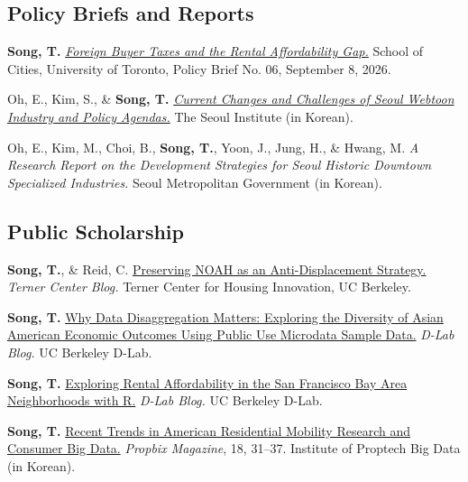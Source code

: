 \documentclass[11pt,letterpaper]{article}
\begin{document}
\subsection{Policy Briefs and Reports}
\begin{tablist}
  \item[2026] \tab{}\textbf{Song, T.} \emph{\href{https://schoolofcities.github.io/posts/foreign-buyer-tax-vancouver-toronto/}{Foreign Buyer Taxes and the Rental Affordability Gap.}} School of Cities, University of Toronto, Policy Brief No. 06, September 8, 2026.
  \item[2021] \tab{}Oh, E., Kim, S., \& \textbf{Song, T.} \emph{\href{https://www.si.re.kr/bbs/view.do?key=2024100039&pstSn=2111190001}{Current Changes and Challenges of Seoul Webtoon Industry and Policy Agendas.}} The Seoul Institute (in Korean).
  \item[2020] \tab{}Oh, E., Kim, M., Choi, B., \textbf{Song, T.}, Yoon, J., Jung, H., \& Hwang, M. \emph{A Research Report on the Development Strategies for Seoul Historic Downtown Specialized Industries.} Seoul Metropolitan Government (in Korean).
\end{tablist}

\subsection{Public Scholarship}
\begin{tablist}
  \item[2026] \tab{}\textbf{Song, T.}, \& Reid, C. \href{https://ternercenter.berkeley.edu/blog/preserving-noah-as-an-anti-displacement-strategy/}{Preserving NOAH as an Anti-Displacement Strategy.} \emph{Terner Center Blog.} Terner Center for Housing Innovation, UC Berkeley.
  \item[2025] \tab{}\textbf{Song, T.} \href{https://medium.com/@dlab-berkeley/why-data-disaggregation-matters-exploring-the-diversity-of-asian-american-economic-outcomes-using-8b96e5dcc9a4}{Why Data Disaggregation Matters: Exploring the Diversity of Asian American Economic Outcomes Using Public Use Microdata Sample Data.} \emph{D-Lab Blog.} UC Berkeley D-Lab.
  \item[2024] \tab{}\textbf{Song, T.} \href{https://medium.com/@dlab-berkeley/exploring-rental-affordability-in-the-san-francisco-bay-area-neighborhoods-with-r-c4383f7553e7}{Exploring Rental Affordability in the San Francisco Bay Area Neighborhoods with R.} \emph{D-Lab Blog.} UC Berkeley D-Lab.
  \item[2024] \tab{}\textbf{Song, T.} \href{https://www.kahps.org/data/prbx/pdf_44_7}{Recent Trends in American Residential Mobility Research and Consumer Big Data.} \emph{Propbix Magazine}, 18, 31--37. Institute of Proptech Big Data (in Korean).
\end{tablist}
\end{document}
